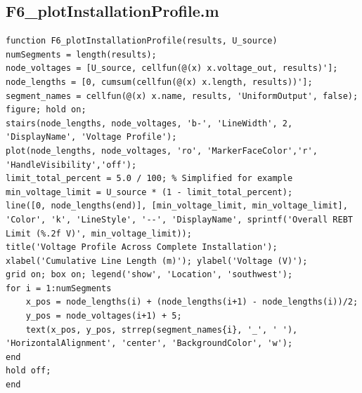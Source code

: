 \documentclass[12pt, a4paper]{article}
\begin{document}
\subsection{F6\_plotInstallationProfile.m}
\begin{lstlisting}[caption={Plots the voltage profile across a multi-segment installation.}, label={lst:F6}]
function F6_plotInstallationProfile(results, U_source)
numSegments = length(results);
node_voltages = [U_source, cellfun(@(x) x.voltage_out, results)'];
node_lengths = [0, cumsum(cellfun(@(x) x.length, results))'];
segment_names = cellfun(@(x) x.name, results, 'UniformOutput', false);
figure; hold on;
stairs(node_lengths, node_voltages, 'b-', 'LineWidth', 2, 'DisplayName', 'Voltage Profile');
plot(node_lengths, node_voltages, 'ro', 'MarkerFaceColor','r', 'HandleVisibility','off');
limit_total_percent = 5.0 / 100; % Simplified for example
min_voltage_limit = U_source * (1 - limit_total_percent);
line([0, node_lengths(end)], [min_voltage_limit, min_voltage_limit], 'Color', 'k', 'LineStyle', '--', 'DisplayName', sprintf('Overall REBT Limit (%.2f V)', min_voltage_limit));
title('Voltage Profile Across Complete Installation');
xlabel('Cumulative Line Length (m)'); ylabel('Voltage (V)');
grid on; box on; legend('show', 'Location', 'southwest');
for i = 1:numSegments
    x_pos = node_lengths(i) + (node_lengths(i+1) - node_lengths(i))/2;
    y_pos = node_voltages(i+1) + 5;
    text(x_pos, y_pos, strrep(segment_names{i}, '_', ' '), 'HorizontalAlignment', 'center', 'BackgroundColor', 'w');
end
hold off;
end
\end{lstlisting}

\end{document}

